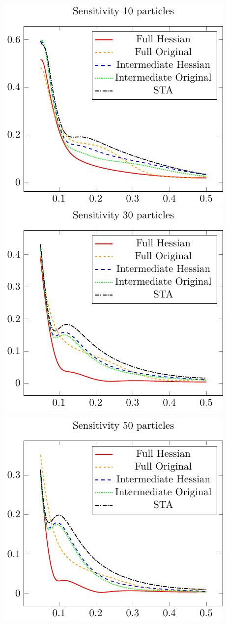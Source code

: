 \documentclass{article}
\begin{document}
\includegraphics{./gfx/sensitivity_np10_nlambda5.pdf}
\includegraphics{./gfx/sensitivity_np30_nlambda5.pdf}

\begin{center}
	\includegraphics{./gfx/sensitivity_np50_nlambda5.pdf}
\end{center}
\end{document}
